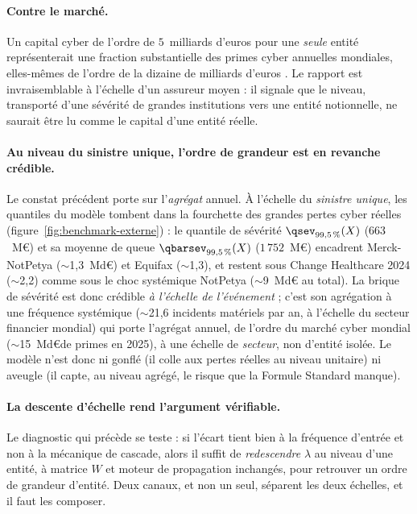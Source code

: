 \paragraph{Contre le marché.} Un capital cyber de l'ordre de $5$~milliards d'euros pour une
\emph{seule} entité représenterait une fraction substantielle des primes cyber annuelles
mondiales, elles-mêmes de l'ordre de la dizaine de milliards d'euros
\citep{munichre_cyber_2024}. Le rapport est invraisemblable à l'échelle d'un assureur moyen :
il signale que le niveau, transporté d'une sévérité de grandes institutions vers une entité
notionnelle, ne saurait être lu comme le capital d'une entité réelle.

\paragraph{Au niveau du sinistre unique, l'ordre de grandeur est en revanche crédible.} Le
constat précédent porte sur l'\emph{agrégat} annuel. À l'échelle du \emph{sinistre unique},
les quantiles du modèle tombent dans la fourchette des grandes pertes cyber réelles
(figure~\ref{fig:benchmark-externe}) : le quantile de sévérité $\qsev_{99{,}5\,\%}(X)$
($663$~M\euro) et sa moyenne de queue $\qbarsev_{99{,}5\,\%}(X)$ ($1\,752$~M\euro) encadrent
Merck-NotPetya ($\sim$1,3~Md\euro) et Equifax ($\sim$1,3), et restent sous Change
Healthcare 2024 ($\sim$2,2) comme sous le choc systémique NotPetya ($\sim$9~Md\euro
au total). La brique de sévérité est donc crédible \emph{à l'échelle de l'événement} ; c'est
son agrégation à une fréquence systémique ($\sim$21,6 incidents matériels par an, à
l'échelle du secteur financier mondial) qui porte l'agrégat annuel, de l'ordre du marché
cyber mondial ($\sim$15~Md\euro de primes en 2025), à une échelle de \emph{secteur}, non
d'entité isolée. Le modèle n'est donc ni gonflé (il colle aux pertes réelles au niveau
unitaire) ni aveugle (il capte, au niveau agrégé, le risque que la Formule Standard manque).

\paragraph{La descente d'échelle rend l'argument vérifiable.} Le diagnostic qui précède se
teste : si l'écart tient bien à la fréquence d'entrée et non à la mécanique de cascade, alors
il suffit de \emph{redescendre} $\lambda$ au niveau d'une entité, à matrice $W$ et moteur de
propagation inchangés, pour retrouver un ordre de grandeur d'entité. Deux canaux, et non un
seul, séparent les deux échelles, et il faut les composer.

